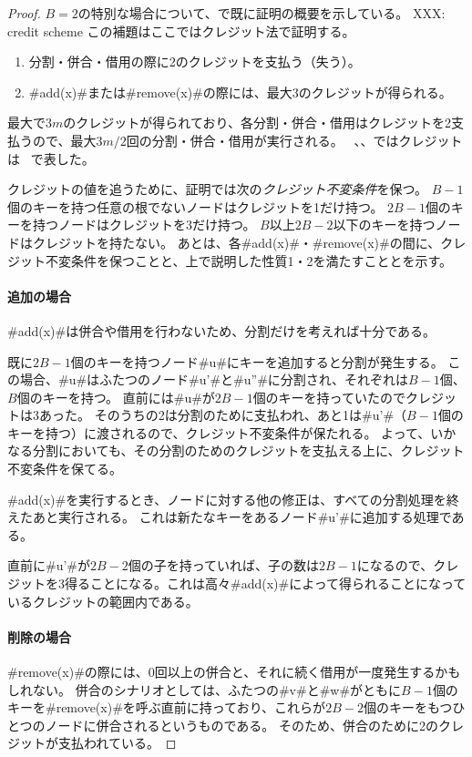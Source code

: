 \begin{proof}
   $B=2$の特別な場合について、で既に証明の概要を示している。
   XXX: credit scheme
   この補題はここではクレジット法で証明する。
  \begin{enumerate}
    \item 分割・併合・借用の際に2のクレジットを支払う（失う）。
    \item #add(x)#または#remove(x)#の際には、最大3のクレジットが得られる。
  \end{enumerate}
  最大で$3m$のクレジットが得られており、各分割・併合・借用はクレジットを2支払うので、最大$3m/2$回の分割・併合・借用が実行される。
  ~、、ではクレジットは \cent\ で表した。

  クレジットの値を追うために、証明では次の\emph{クレジット不変条件}を保つ。
  $B-1$個のキーを持つ任意の根でないノードはクレジットを1だけ持つ。
  $2B-1$個のキーを持つノードはクレジットを3だけ持つ。
  $B$以上$2B-2$以下のキーを持つノードはクレジットを持たない。
  あとは、各#add(x)#・#remove(x)#の間に、クレジット不変条件を保つことと、上で説明した性質1・2を満たすこととを示す。

  \paragraph{追加の場合}
  #add(x)#は併合や借用を行わないため、分割だけを考えれば十分である。

  既に$2B-1$個のキーを持つノード#u#にキーを追加すると分割が発生する。
  この場合、#u#はふたつのノード#u'#と#u''#に分割され、それぞれは$B-1$個、$B$個のキーを持つ。
  直前には#u#が$2B-1$個のキーを持っていたのでクレジットは3あった。
  そのうちの2は分割のために支払われ、あと1は#u'#（$B-1$個のキーを持つ）に渡されるので、クレジット不変条件が保たれる。
  よって、いかなる分割においても、その分割のためのクレジットを支払える上に、クレジット不変条件を保てる。

  #add(x)#を実行するとき、ノードに対する他の修正は、すべての分割処理を終えたあと実行される。
  これは新たなキーをあるノード#u'#に追加する処理である。

  直前に#u'#が$2B-2$個の子を持っていれば、子の数は$2B-1$になるので、クレジットを3得ることになる。これは高々#add(x)#によって得られることになっているクレジットの範囲内である。

  \paragraph{削除の場合}
  #remove(x)#の際には、0回以上の併合と、それに続く借用が一度発生するかもしれない。
  併合のシナリオとしては、ふたつの#v#と#w#がともに$B-1$個のキーを#remove(x)#を呼ぶ直前に持っており、これらが$2B-2$個のキーをもつひとつのノードに併合されるというものである。
  そのため、併合のために2のクレジットが支払われている。


\end{proof}
